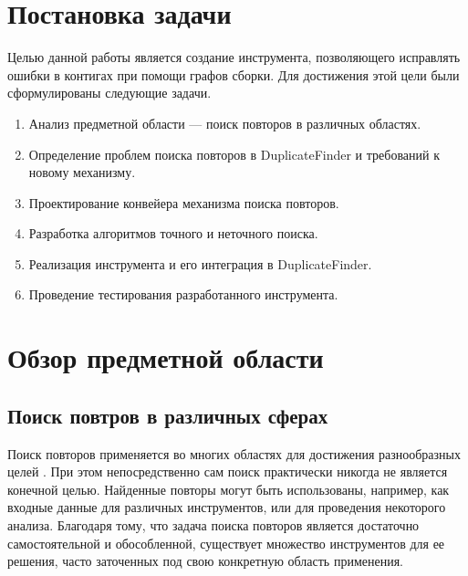 \documentclass[14pt]{matmex-diploma-custom}
\begin{document}
\section{Постановка задачи}
Целью данной работы является создание инструмента, позволяющего исправлять ошибки в контигах при помощи графов сборки. Для достижения этой цели были сформулированы следующие задачи.
\begin{enumerate}
	\item Анализ предметной области --- поиск повторов в различных областях.
	\item Определение проблем поиска повторов в DuplicateFinder и требований к новому механизму.
	\item Проектирование конвейера механизма поиска повторов.
	\item Разработка алгоритмов точного и неточного поиска.
	\item Реализация инструмента и его интеграция в DuplicateFinder.
	\item Проведение тестирования разработанного инструмента.
\end{enumerate}

\section{Обзор предметной области}
\subsection{Поиск повтров в различных сферах}
Поиск повторов применяется во многих областях для достижения разнообразных целей \cite{bib:art:NearDupSurvey}. При этом непосредственно сам поиск практически никогда не является конечной целью. Найденные повторы могут быть использованы, например, как входные данные для различных инструментов, или для проведения некоторого анализа. Благодаря тому, что задача поиска повторов является достаточно самостоятельной и обособленной, существует множество инструментов для ее решения, часто заточенных под свою конкретную область применения.
\end{document}
